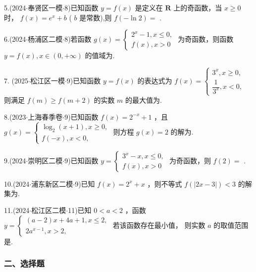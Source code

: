 5.(2024$\cdot$奉贤区一模$\cdot$8)已知函数 $y = f\left( x\right)$ 是定义在 $\mathbf{R}$ 上的奇函数，当 $x \geq  0$ 时， $f\left( x\right)  = {{e}}^{x} + b$ ( $b$ 是常数),则 $f\left( {-\ln 2}\right)  =$ \blkda[2]{}.

6.(2024$\cdot$杨浦区二模$\cdot$8)若函数 $g\left( x\right)  = \left\{  \begin{array}{l} {2}^{x} - 1,x \leq  0, \\  f\left( x\right) ,x > 0 \end{array}\right.$ 为奇函数，则函数 $y = f\left( x\right) ,x \in  \left( {0, + \infty }\right)$ 的值域为\blkda[2]{}.

7. (2025$\cdot$松江区一模$\cdot$9)已知函数 $y = f\left( x\right)$ 的表达式为 $f\left( x\right)  = \left\{  \begin{array}{l} {3}^{x},x \geq  0, \\  \dfrac{1}{{3}^{x}},x < 0, \end{array}\right.$ 则满足 $f\left( m\right)  \geq  f\left( {m + 2}\right)$ 的实数 $m$ 的最大值为\blkda[2]{}.

8.(2023$\cdot$上海春季卷$\cdot$9)已知函数 $f\left( x\right)  = {2}^{-x} + 1$ ，且 $g\left( x\right)  = \left\{  \begin{array}{l} {\log }_{2}\left( {x + 1}\right) ,x \geq  0, \\  f\left( {-x}\right) ,x < 0, \end{array}\right.$ 则方程 $g\left( x\right)  = 2$ 的解为\blkda[2]{}.

9.(2024$\cdot$崇明区二模$\cdot$9)已知函数 $y = \left\{  \begin{array}{l} {3}^{x} - x,x \leq  0, \\  f\left( x\right) ,x > 0 \end{array}\right.$ 为奇函数，则 $f\left( 2\right)  =$ \blkda[2]{}.

10.(2024$\cdot$浦东新区二模$\cdot$9)已知 $f\left( x\right)  = {2}^{x} + x$ ，则不等式 $f\left( \left| {{2x} - 3}\right| \right)  < 3$ 的解集为\blkda[2]{}.

11.(2024$\cdot$松江区二模$\cdot$11)已知 $0 < a < 2$ ，函数 $y = \left\{  \begin{array}{l} \left( {a - 2}\right) x + {4a} + 1,x \leq  2, \\  2{a}^{x - 1},x > 2, \end{array}\right.$ 若该函数存在最小值， 则实数 $a$ 的取值范围是\blkda[2]{}.

\subsubsection*{二、选择题}

